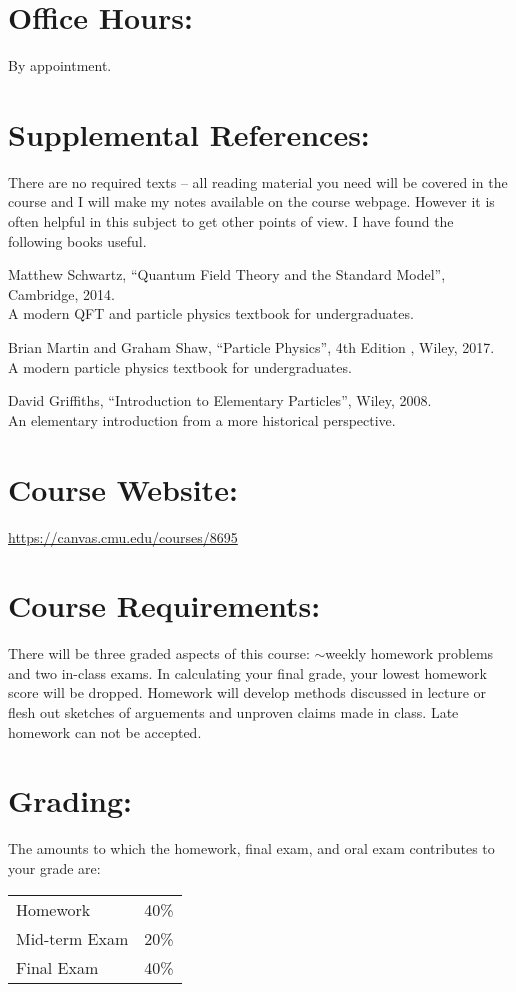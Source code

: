\documentclass[margin,line]{res}
\begin{document}
\begin{resume}
\section{Office Hours:}
By appointment.



\section{Supplemental References:}
There are no required texts -- all reading material you need will be covered in the course and I will make my notes available on the course webpage. 
However it is often helpful in this subject to get other points of view.  
I have found the following books useful. 

Matthew Schwartz, ``Quantum Field Theory and the Standard Model'', Cambridge, 2014.\\
A modern QFT and particle physics textbook for undergraduates.

Brian Martin and Graham Shaw, ``Particle Physics'', 4th Edition , Wiley, 2017.\\
A modern particle physics textbook for undergraduates.

David Griffiths, ``Introduction to Elementary Particles'', Wiley, 2008.\\
An elementary introduction from a more historical perspective.

\section{Course Website:}  
\href{https://canvas.cmu.edu/courses/8695}{https://canvas.cmu.edu/courses/8695}

\section{Course Requirements:}
There will be three graded aspects of this course: $\sim$weekly homework problems and two in-class exams.
In calculating your final grade, your lowest homework score will be dropped.
Homework will develop methods discussed in lecture or flesh out sketches of arguements and unproven claims made in class.
Late homework can not be accepted.

\section{Grading:} 
The amounts to which the homework, final exam, and oral exam contributes to
your grade are:
\begin{center}
\begin{tabular}{lc}
Homework & 40\%\\
Mid-term Exam & 20\%\\
Final Exam & 40\%\\
\end{tabular}
\end{center}


\end{resume}
\end{document}
